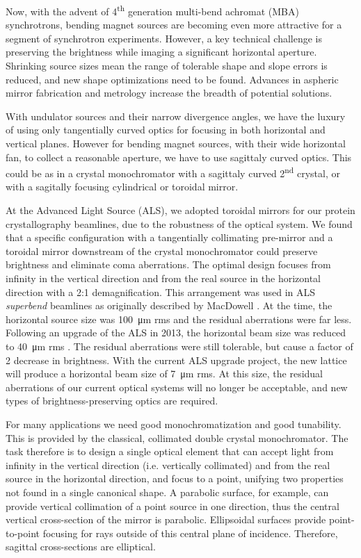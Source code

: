 \documentclass{iucr}       %
\begin{document}
Now, with the advent of 4\textsuperscript{th} generation multi-bend achromat (MBA) synchrotrons, bending magnet sources are becoming even more attractive for a segment of synchrotron experiments. However, a key technical challenge is preserving the brightness while imaging a significant horizontal aperture. Shrinking source sizes mean the range of tolerable shape and slope errors is reduced, and new shape optimizations need to be found. Advances in aspheric mirror fabrication and metrology increase the breadth of potential solutions.

With undulator sources and their narrow divergence angles, we have the luxury of using only tangentially curved optics for focusing in both horizontal and vertical planes. However for bending magnet sources, with their wide horizontal fan, to collect a reasonable aperture, we have to use sagittaly curved optics. This could be as in a crystal monochromator with a sagittaly curved 2\textsuperscript{nd} crystal, or with a sagitally focusing cylindrical or toroidal mirror.

At the Advanced Light Source (ALS), we adopted toroidal mirrors for our protein crystallography beamlines, due to the robustness of the optical system. We found that a specific configuration with a tangentially collimating pre-mirror and a toroidal mirror downstream of the crystal monochromator could preserve brightness and eliminate coma aberrations. The optimal design focuses from infinity in the vertical direction and from the real source in the horizontal direction with a 2:1 demagnification. This arrangement was used in ALS \emph{superbend} beamlines as originally described by MacDowell \cite{MacDowell2004}. At the time, the horizontal source size was \SI{100}{\micro\meter} rms and the residual aberrations were far less. Following an upgrade of the ALS in 2013, the horizontal beam size was reduced to \SI{40}{\micro\meter} rms \cite{Steier_2014}. The residual aberrations were still tolerable, but cause a factor of 2 decrease in brightness. With the current ALS upgrade project, the new lattice will produce a horizontal beam size of \SI{7}{\micro\meter} rms. At this size, the residual aberrations of our current optical systems will no longer be acceptable, and new types of brightness-preserving optics are required.

For many applications we need good monochromatization and good tunability. This is provided by the classical, collimated double crystal monochromator. The task therefore is to design a single optical element that can accept light from infinity in the vertical direction (i.e. vertically collimated) and from the real source in the horizontal direction, and focus to a point, unifying two properties not found in a single canonical shape. A parabolic surface, for example, can provide vertical collimation of a point source in one direction, thus the central vertical cross-section of the mirror is parabolic. Ellipsoidal surfaces provide point-to-point focusing for rays outside of this central plane of incidence. Therefore, sagittal cross-sections are elliptical. 
\end{document}
